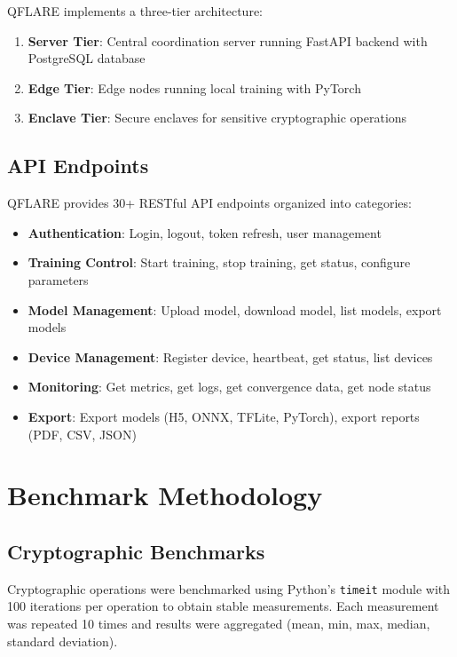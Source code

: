 \documentclass[12pt,a4paper]{article}
\begin{document}
QFLARE implements a three-tier architecture:

\begin{enumerate}
    \item \textbf{Server Tier}: Central coordination server running FastAPI backend with PostgreSQL database
    \item \textbf{Edge Tier}: Edge nodes running local training with PyTorch
    \item \textbf{Enclave Tier}: Secure enclaves for sensitive cryptographic operations
\end{enumerate}

\subsection{API Endpoints}

QFLARE provides 30+ RESTful API endpoints organized into categories:

\begin{itemize}
    \item \textbf{Authentication}: Login, logout, token refresh, user management
    \item \textbf{Training Control}: Start training, stop training, get status, configure parameters
    \item \textbf{Model Management}: Upload model, download model, list models, export models
    \item \textbf{Device Management}: Register device, heartbeat, get status, list devices
    \item \textbf{Monitoring}: Get metrics, get logs, get convergence data, get node status
    \item \textbf{Export}: Export models (H5, ONNX, TFLite, PyTorch), export reports (PDF, CSV, JSON)
\end{itemize}

\section{Benchmark Methodology}
\label{appendix:methodology}

\subsection{Cryptographic Benchmarks}

Cryptographic operations were benchmarked using Python's \texttt{timeit} module with 100 iterations per operation to obtain stable measurements. Each measurement was repeated 10 times and results were aggregated (mean, min, max, median, standard deviation).
\end{document}
